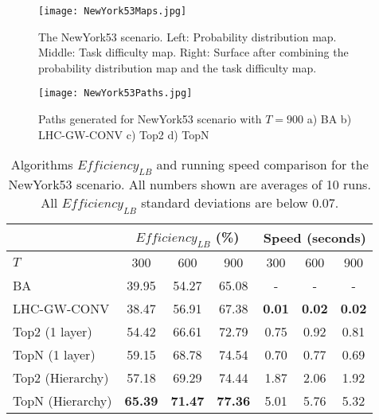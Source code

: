 \begin{figure}[!ht]
\centering
\texttt{[image: NewYork53Maps.jpg]}
\caption{The NewYork53 scenario. Left: Probability distribution map. Middle: Task difficulty map. Right: Surface after combining the probability distribution map and the task difficulty map.}
\label{NewYork53Maps}
\end{figure}
\begin{figure}[!ht]
\centering
\texttt{[image: NewYork53Paths.jpg]}
\caption{Paths generated for NewYork53 scenario with $T=900$ a) BA b) LHC-GW-CONV c) Top2 d) TopN}
\label{NewYork53Paths}
\end{figure}
\begin{table}[!ht]
\caption{Algorithms $\mathit{Efficiency_{LB}}$ and running speed comparison for the NewYork53 scenario. All numbers shown are averages of 10 runs. All $\mathit{Efficiency_{LB}}$ standard deviations are below 0.07.}
	\centering
		\begin{tabular}
			{|l|c|c|c|c|c|c|}
			\hline
			 & \multicolumn{3}{|c|}{$\mathit{Efficiency_{LB}}$ (\%)} & \multicolumn{3}{|c|}{Speed (seconds)} \\
			\hline
			$T$ & 300 & 600 & 900	& 300 & 600 & 900 \\
			\hline
			BA & 39.95 & 54.27 & 65.08 & - & - & - \\
			\hline			
			LHC-GW-CONV & 38.47 & 56.91 & 67.38 & \textbf{0.01} & \textbf{0.02} & \textbf{0.02} \\
			\hline			
			Top2 (1 layer)	& 54.42 & 66.61 & 72.79 & 0.75 & 0.92 & 0.81 \\ 
			\hline
			TopN (1 layer)	& 59.15 & 68.78 & 74.54 & 0.70 & 0.77 & 0.69 \\ 
			\hline
			Top2 (Hierarchy) & 57.18 & 69.29 & 74.44 & 1.87 & 2.06 & 1.92 \\ 
			\hline
			TopN (Hierarchy) & \textbf{65.39} & \textbf{71.47} & \textbf{77.36} & 5.01 & 5.76 & 5.32 \\ 
			\hline			
		\end{tabular}
\label{NewYork53}
\end{table}

